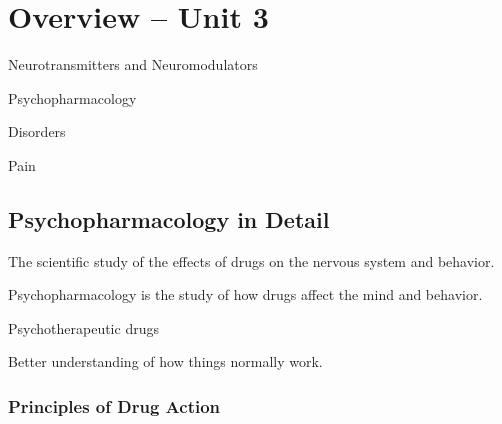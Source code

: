 
\section{Overview -- Unit 3}

\begin{coloredlist}
    \item Neurotransmitters and Neuromodulators
    \begin{coloredlist}
        \item Psychopharmacology
        \item Disorders
        \item Pain
    \end{coloredlist}
\end{coloredlist}

\subsection{Psychopharmacology in Detail}

\begin{coloredlist}
    \item The scientific study of the effects of drugs on the nervous system and behavior.
    \item Psychopharmacology is the study of how drugs affect the mind and behavior.
    \begin{coloredlist}
        \item Psychotherapeutic drugs
        \item Better understanding of how things normally work.
    \end{coloredlist}
\end{coloredlist}

\subsubsection{Principles of Drug Action}

